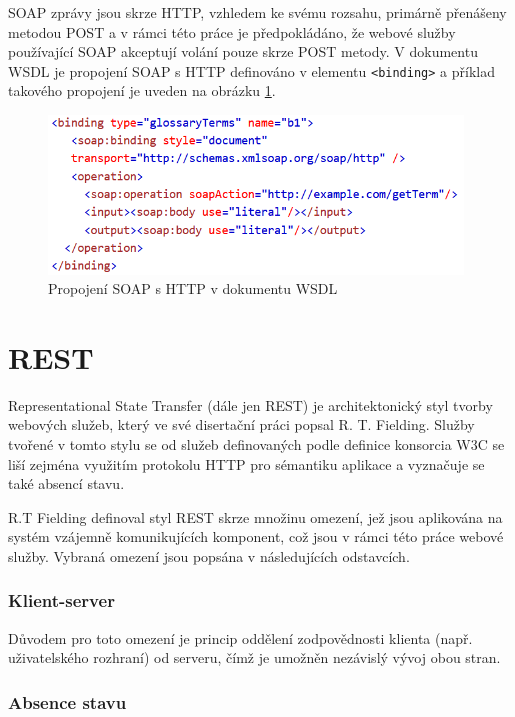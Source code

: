 \documentclass[czech,DP]{thesiskiv}
\begin{document}
SOAP zprávy jsou skrze HTTP, vzhledem ke svému rozsahu, primárně přenášeny metodou POST a v rámci této práce je předpokládáno, že webové služby používající SOAP akceptují volání pouze skrze POST metody. V dokumentu WSDL je propojení SOAP s HTTP definováno v elementu \verb|<binding>| a příklad takového propojení je uveden na obrázku \ref{fig:soap-http-binding}.

\begin{figure}[h]
	\centering
	\includegraphics[width=11cm]{soap-http-binding}
	\caption{Propojení SOAP s HTTP v dokumentu WSDL}
	\label{fig:soap-http-binding}
\end{figure}


\section{REST}
\label{sec:rest}

%

Representational State Transfer (dále jen REST) je architektonický styl tvorby webových služeb, který ve své disertační práci \cite{fielding2000rest} popsal R. T. Fielding. Služby tvořené v tomto stylu se od služeb definovaných podle definice konsorcia W3C se liší zejména využitím protokolu HTTP pro sémantiku aplikace a vyznačuje se také absencí stavu. 

R.T Fielding definoval styl REST skrze množinu omezení, jež jsou aplikována na systém vzájemně komunikujících komponent, což jsou v rámci této práce webové služby. Vybraná omezení jsou popsána v následujících odstavcích.

\subsubsection{Klient-server}
Důvodem pro toto omezení je princip oddělení zodpovědnosti klienta (např. uživatelského rozhraní) od serveru, čímž je umožněn nezávislý vývoj  obou stran.

\subsubsection{Absence stavu}
\end{document}
